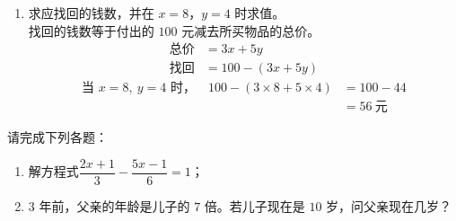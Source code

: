 \documentclass[12pt,a4paper,fontset=none]{exam-zh}
\begin{document}
\begin{solution}
\begin{enumerate}[label=(\alph*)]
        \item 求应找回的钱数，并在 $x=8$，$y=4$ 时求值。 \\
        找回的钱数等于付出的 $100$ 元减去所买物品的总价。 \\
        \begin{align*}
            \text{总价} &= 3x + 5y \\
            \text{找回} &= 100 - (3x + 5y)
        \end{align*}
        \begin{align*}
            \text{当 } x = 8,\ y = 4 \text{ 时，}\quad 100 - (3\times8 + 5\times4) &= 100 - 44 \\
            &= 56 \ \text{元}
        \end{align*}
    \end{enumerate}
\end{solution}

\newpage

\begin{question}[points = 10]
    请完成下列各题：

    \begin{enumerate}[label=(\alph*)]
        \item 解方程式$\dfrac{2x+1}{3} - \dfrac{5x-1}{6} = 1$；

        \item $3$ 年前，父亲的年龄是儿子的 $7$ 倍。若儿子现在是 $10$ 岁，问父亲现在几岁？
    \end{enumerate}
\end{question}
\end{document}
